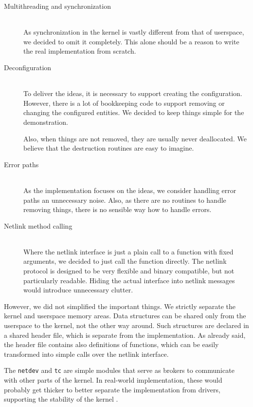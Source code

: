 \begin{description}
	\item[Multithreading and synchronization] \hfill \\
		As synchronization in the kernel is vastly different from that of
		user\-space, we decided to omit it completely. This alone should be
		a reason to write the real implementation from scratch.

	\item[Deconfiguration] \hfill \\
		To deliver the ideas, it is necessary to support creating the
		configuration. However, there is a lot of bookkeeping code to support
		removing or changing the configured entities. We decided to keep
		things simple for the demonstration.

		Also, when things are not removed, they are usually never deallocated.
		We believe that the destruction routines are easy to imagine.

	\item[Error paths] \hfill \\
		As the implementation focuses on the ideas, we consider handling error
		paths an unnecessary noise. Also, as there are no routines to handle
		removing things, there is no sensible way how to handle errors.

	\item[Netlink method calling] \hfill \\
		Where the netlink interface is just a plain call to a function with
		fixed arguments, we decided to just call the function directly. The
		netlink protocol is designed to be very flexible and binary
		compatible, but not particularly readable. Hiding the actual interface
		into netlink messages would introduce unnecessary clutter.
\end{description}

\noindent However, we did not simplified the important things. We strictly separate the
kernel and userspace memory areas. Data structures can be shared only from the
userspace to the kernel, not the other way around. Such structures are declared
in a shared header file, which is separate from the implementation. As already
said, the header file contains also definitions of functions, which can be
easily transformed into simple calls over the netlink interface.

The \texttt{netdev} and \texttt{tc} are simple modules that serve as brokers to
communicate with other parts of the kernel. In real-world implementation, these
would probably get thicker to better separate the implementation from drivers,
supporting the stability of the kernel .

